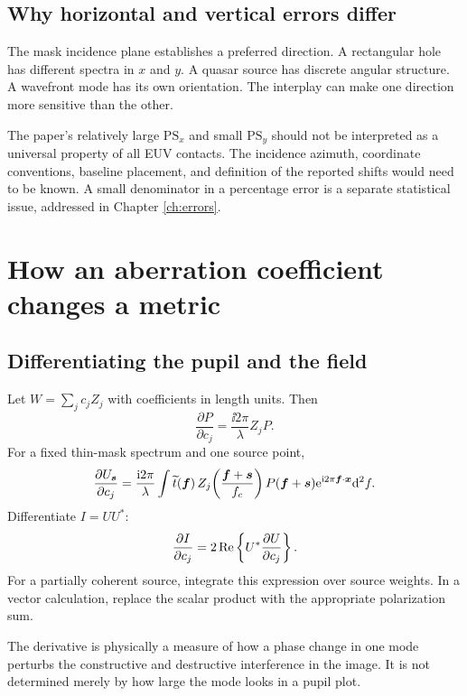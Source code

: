 \section{Why horizontal and vertical errors differ}
The mask incidence plane establishes a preferred direction. A rectangular
hole has different spectra in $x$ and $y$. A quasar source has discrete
angular structure. A wavefront mode has its own orientation.
The interplay can make one direction more sensitive than the other.

The paper's relatively large $\mathrm{PS}_x$ and small
$\mathrm{PS}_y$ should not be interpreted as a universal property of all
EUV contacts. The incidence azimuth, coordinate conventions, baseline
placement, and definition of the reported shifts would need to be known.
A small denominator in a percentage error is a separate statistical issue,
addressed in Chapter \ref{ch:errors}.

\chapter{How an aberration coefficient changes a metric}\label{ch:sensitivity}
\section{Differentiating the pupil and the field}
Let $W=\sum_jc_jZ_j$ with coefficients in length units.
Then
\begin{equation}
\frac{\partial P}{\partial c_j}
=\frac{\ii2\pi}{\lambda}Z_jP.
\label{eq:pupilDerivative}
\end{equation}
For a fixed thin-mask spectrum and one source point,
\[
\frac{\partial U_{\bm{s}}}{\partial c_j}
=\frac{\mathrm{i}2\pi}{\lambda}
\int \widetilde t(\bm{f})\,
Z_j\!\left(\frac{\bm{f}+\bm{s}}{f_c}\right)
P(\bm{f}+\bm{s})\mathrm{e}^{\mathrm{i}2\pi\bm{f}\cdot\bm{x}}\mathrm{d}^2f.
\]
Differentiate $I=UU^*$:
\begin{equation}
\frac{\partial I}{\partial c_j}
=2\operatorname{Re}\left\{U^*\frac{\partial U}{\partial c_j}\right\}.
\label{eq:intDerivative}
\end{equation}
For a partially coherent source, integrate this expression over source
weights. In a vector calculation, replace the scalar product with the
appropriate polarization sum.

The derivative is physically a measure of how a phase change in one
mode perturbs the constructive and destructive interference in the image.
It is not determined merely by how large the mode looks in a pupil plot.

